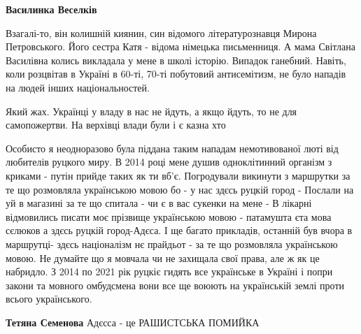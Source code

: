 \begin{itemize}
\begin{itemize}
\textbf{Василинка Веселків} 

Взагалі-то, він колишній киянин, син відомого літературознавця Мирона
Петровського. Його сестра Катя - відома німецька письменниця. А мама Світлана
Василівна колись викладала у мене в школі історію. Випадок ганебний. Навіть,
коли розцвітав в Україні в 60-ті, 70-ті побутовий антисемітизм, не було нападів
на людей інших національностей.

\end{itemize}

 
Який жах. Українці у владу в нас не йдуть, а якщо йдуть, то не для самопожертви. На верхівці влади були і є казна хто

 

Особисто я неодноразово була піддана таким нападам немотивованої люті від
любителів руцкого миру. В 2014 році мене душив одноклітинний організм з криками
- путін прийде таких як ти вб'є. Погродували викинути з маршрутки за те що
розмовляла українською мовою бо - у нас здєсь руцкій город - Послали на уй в
магазині за те що спитала - чи є в вас сукенки на мене - В лікарні відмовились
писати моє прізвище українською мовою - патамушта єта мова сєлюков а здєсь
руцкій город-Адєса. І ще багато прикладів, останній був вчора в маршрутці-
здєсь націоналізм нє прайдьот - за те що розмовляла українською мовою. Не
думайте що я мовчала чи не захищала свої права, але ж як це набридло. З 2014 по
2021 рік руцкіє гидять все українське в Україні і попри закони та мовного
омбудсмена вони все ще воюють на українській землі проти всього українського.

\begin{itemize}
 
\textbf{Тетяна Семенова} Адєсса - це РАШИСТСЬКА ПОМИЙКА 🤮🤮🤮


\end{itemize}
\end{itemize}
